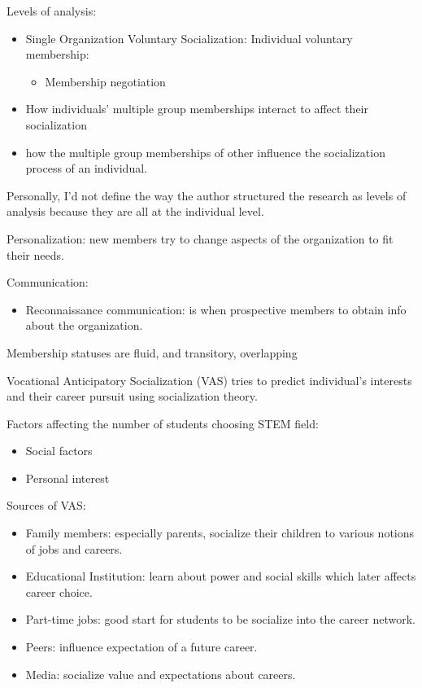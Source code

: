 \documentclass[
]{book}
\providecommand{\tightlist}{%
  \setlength{\itemsep}{0pt}\setlength{\parskip}{0pt}}
\begin{document}
Levels of analysis:

\begin{itemize}
\item
  Single Organization Voluntary Socialization: Individual voluntary membership:

  \begin{itemize}
  \tightlist
  \item
    Membership negotiation
  \end{itemize}
\item
  How individuals' multiple group memberships interact to affect their socialization
\item
  how the multiple group memberships of other influence the socialization process of an individual.
\end{itemize}

Personally, I'd not define the way the author structured the research as levels of analysis because they are all at the
individual level.

Personalization: new members try to change aspects of the organization to fit their needs.

Communication:

\begin{itemize}
\tightlist
\item
  Reconnaissance communication: is when prospective members to obtain info about the organization.
\end{itemize}

Membership statuses are fluid, and transitory, overlapping

\citep{Myers_2010}

Vocational Anticipatory Socialization (VAS) tries to predict individual's interests and their career pursuit using
socialization theory.

Factors affecting the number of students choosing STEM field:

\begin{itemize}
\tightlist
\item
  Social factors
\item
  Personal interest
\end{itemize}

Sources of VAS:

\begin{itemize}
\tightlist
\item
  Family members: especially parents, socialize their children to various notions of jobs and careers.
\item
  Educational Institution: learn about power and social skills which later affects career choice.
\item
  Part-time jobs: good start for students to be socialize into the career network.
\item
  Peers: influence expectation of a future career.
\item
  Media: socialize value and expectations about careers.
\end{itemize}
\end{document}
